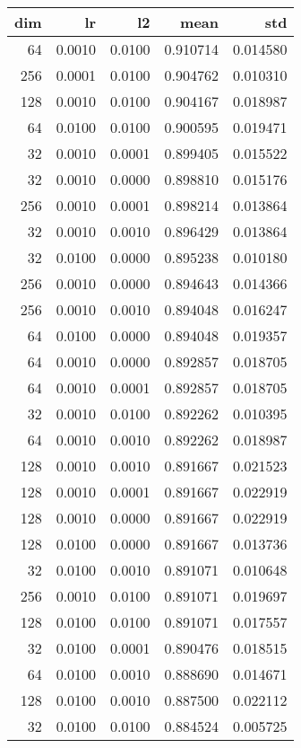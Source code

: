 \begin{tabular}{rrrrr}
\toprule
 dim &      lr &      l2 &      mean &       std \\
\midrule
  64 &  0.0010 &  0.0100 &  0.910714 &  0.014580 \\
 256 &  0.0001 &  0.0100 &  0.904762 &  0.010310 \\
 128 &  0.0010 &  0.0100 &  0.904167 &  0.018987 \\
  64 &  0.0100 &  0.0100 &  0.900595 &  0.019471 \\
  32 &  0.0010 &  0.0001 &  0.899405 &  0.015522 \\
  32 &  0.0010 &  0.0000 &  0.898810 &  0.015176 \\
 256 &  0.0010 &  0.0001 &  0.898214 &  0.013864 \\
  32 &  0.0010 &  0.0010 &  0.896429 &  0.013864 \\
  32 &  0.0100 &  0.0000 &  0.895238 &  0.010180 \\
 256 &  0.0010 &  0.0000 &  0.894643 &  0.014366 \\
 256 &  0.0010 &  0.0010 &  0.894048 &  0.016247 \\
  64 &  0.0100 &  0.0000 &  0.894048 &  0.019357 \\
  64 &  0.0010 &  0.0000 &  0.892857 &  0.018705 \\
  64 &  0.0010 &  0.0001 &  0.892857 &  0.018705 \\
  32 &  0.0010 &  0.0100 &  0.892262 &  0.010395 \\
  64 &  0.0010 &  0.0010 &  0.892262 &  0.018987 \\
 128 &  0.0010 &  0.0010 &  0.891667 &  0.021523 \\
 128 &  0.0010 &  0.0001 &  0.891667 &  0.022919 \\
 128 &  0.0010 &  0.0000 &  0.891667 &  0.022919 \\
 128 &  0.0100 &  0.0000 &  0.891667 &  0.013736 \\
  32 &  0.0100 &  0.0010 &  0.891071 &  0.010648 \\
 256 &  0.0010 &  0.0100 &  0.891071 &  0.019697 \\
 128 &  0.0100 &  0.0100 &  0.891071 &  0.017557 \\
  32 &  0.0100 &  0.0001 &  0.890476 &  0.018515 \\
  64 &  0.0100 &  0.0010 &  0.888690 &  0.014671 \\
 128 &  0.0100 &  0.0010 &  0.887500 &  0.022112 \\
  32 &  0.0100 &  0.0100 &  0.884524 &  0.005725 \\

\end{tabular}
